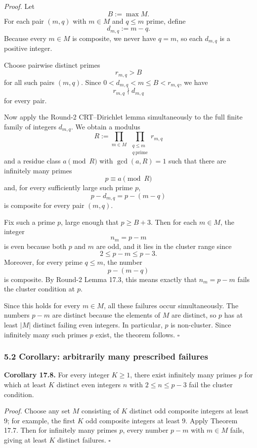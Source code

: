 \emph{Proof.}
Let
\[
B:=\max M.
\]
For each pair $(m,q)$ with $m\in M$ and $q\le m$ prime, define
\[
d_{m,q}:=m-q.
\]
Because every $m\in M$ is composite, we never have $q=m$, so each $d_{m,q}$ is a positive integer.

Choose pairwise distinct primes
\[
r_{m,q}>B
\]
for all such pairs $(m,q)$. Since $0<d_{m,q}<m\le B<r_{m,q}$, we have
\[
r_{m,q}\nmid d_{m,q}
\]
for every pair.

Now apply the Round-2 CRT--Dirichlet lemma simultaneously to the full finite family of integers $d_{m,q}$. We obtain a modulus
\[
R:=\prod_{m\in M}\ \prod_{\substack{q\le m \\ q\ \mathrm{prime}}} r_{m,q}
\]
and a residue class $a\pmod R$ with $\gcd(a,R)=1$ such that there are infinitely many primes
\[
p\equiv a\pmod R
\]
and, for every sufficiently large such prime $p$,
\[
p-d_{m,q}=p-(m-q)
\]
is composite for every pair $(m,q)$.

Fix such a prime $p$, large enough that $p\ge B+3$. Then for each $m\in M$, the integer
\[
n_m=p-m
\]
is even because both $p$ and $m$ are odd, and it lies in the cluster range since
\[
2\le p-m\le p-3.
\]
Moreover, for every prime $q\le m$, the number
\[
p-(m-q)
\]
is composite. By Round-2 Lemma 17.3, this means exactly that $n_m=p-m$ fails the cluster condition at $p$.

Since this holds for every $m\in M$, all these failures occur simultaneously. The numbers $p-m$ are distinct because the elements of $M$ are distinct, so $p$ has at least $|M|$ distinct failing even integers. In particular, $p$ is non-cluster. Since infinitely many such primes $p$ exist, the theorem follows. \hfill$\square$

\subsubsection*{5.2 Corollary: arbitrarily many prescribed failures}

\textbf{Corollary 17.8.}
For every integer $K\ge 1$, there exist infinitely many primes $p$ for which at least $K$ distinct even integers $n$ with $2\le n\le p-3$ fail the cluster condition.

\emph{Proof.}
Choose any set $M$ consisting of $K$ distinct odd composite integers at least $9$; for example, the first $K$ odd composite integers at least $9$. Apply Theorem 17.7. Then for infinitely many primes $p$, every number $p-m$ with $m\in M$ fails, giving at least $K$ distinct failures. \hfill$\square$

